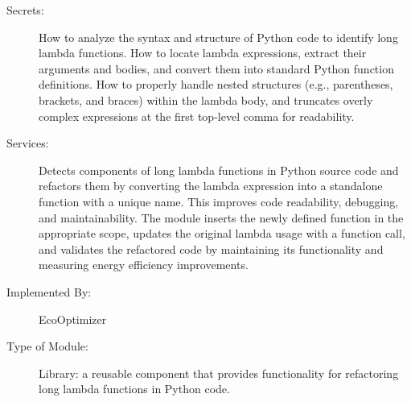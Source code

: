 \documentclass[12pt, titlepage]{article}
\begin{document}
\begin{description} 
  \item[Secrets:] How to analyze the syntax and structure of Python code to identify long lambda functions. How to locate lambda expressions, extract their arguments and bodies, and convert them into standard Python function definitions. How to properly handle nested structures (e.g., parentheses, brackets, and braces) within the lambda body, and truncates overly complex expressions at the first top-level comma for readability.

  \item[Services:] Detects components of long lambda functions in Python source code and refactors them by converting the lambda expression into a standalone function with a unique name. This improves code readability, debugging, and maintainability. The module inserts the newly defined function in the appropriate scope, updates the original lambda usage with a function call, and validates the refactored code by maintaining its functionality and measuring energy efficiency improvements.

  \item[Implemented By:] EcoOptimizer
  
  \item[Type of Module:] Library: a reusable component that provides functionality for refactoring long lambda functions in Python code.
\end{description}
\end{document}
